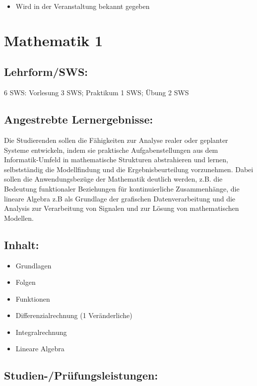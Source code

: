 \begin{itemize}
\tightlist
\item
  Wird in der Veranstaltung bekannt gegeben
\end{itemize}

\chapter{Mathematik 1}\label{mathematik-1}

\section*{Lehrform/SWS:}\label{lehrformsws-9}

6 SWS: Vorlesung 3 SWS; Praktikum 1 SWS; Übung 2 SWS

\section*{Angestrebte
Lernergebnisse:}\label{angestrebte-lernergebnisse-13}

Die Studierenden sollen die Fähigkeiten zur Analyse realer oder
geplanter Systeme entwickeln, indem sie praktische Aufgabenstellungen
aus dem Informatik-Umfeld in mathematische Strukturen abstrahieren und
lernen, selbstständig die Modellfindung und die Ergebnisbeurteilung
vorzunehmen. Dabei sollen die Anwendungsbezüge der Mathematik deutlich
werden, z.B. die Bedeutung funktionaler Beziehungen für kontinuierliche
Zusammenhänge, die lineare Algebra z.B als Grundlage der grafischen
Datenverarbeitung und die Analysis zur Verarbeitung von Signalen und zur
Lösung von mathematischen Modellen.

\section*{Inhalt:}\label{inhalt-13}

\begin{itemize}
\item
  Grundlagen
\item
  Folgen
\item
  Funktionen
\item
  Differenzialrechnung (1 Veränderliche)
\item
  Integralrechnung
\item
  Lineare Algebra
\end{itemize}

\section*{Studien-/Prüfungsleistungen:}\label{studien-pruxfcfungsleistungen-8}

